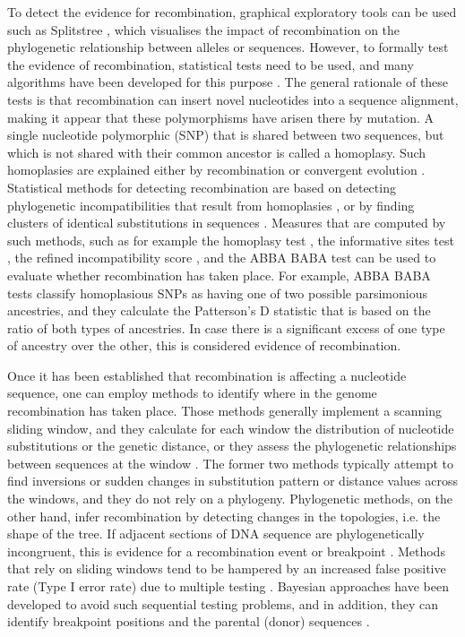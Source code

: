 To detect the evidence for recombination, graphical exploratory tools can be used such as Splitstree \parencite{Huson2006}, which visualises the impact of recombination on the phylogenetic relationship between alleles or sequences. However, to formally test the evidence of recombination, statistical tests need to be used, and many algorithms have been developed for this purpose \parencite{Lemey2009b,Lemey2009c}. The general rationale of these tests is that recombination can insert novel nucleotides into a sequence alignment, making it appear that these polymorphisms have arisen there by mutation. A single nucleotide polymorphic (SNP) that is shared between two sequences, but which is not shared with their common ancestor is called a homoplasy. Such homoplasies are explained either by recombination or convergent evolution \parencite{MaynardSmith1998}. Statistical methods for detecting recombination are based on detecting phylogenetic incompatibilities that result from homoplasies \parencite{Bruen2006,Posada2002}, or by finding clusters of identical substitutions in sequences \parencite{Posada2002}. Measures that are computed by such methods, such as for example the homoplasy test \parencite{MaynardSmith1998}, the informative sites test \parencite{Worobey2001a}, the refined incompatibility score \parencite{Bruen2006}, and the ABBA BABA test \parencite{SMartin2014,Green2010a} can be used to evaluate whether recombination has taken place. For example, ABBA BABA tests classify homoplasious SNPs as having one of two possible parsimonious ancestries, and they calculate the Patterson’s D statistic that is based on the ratio of both types of ancestries. In case there is a significant excess of one type of ancestry over the other, this is considered evidence of recombination.

Once it has been established that recombination is affecting a nucleotide sequence, one can employ methods to identify where in the genome recombination has taken place. Those methods generally implement a scanning sliding window, and they calculate for each window the distribution of nucleotide substitutions or the genetic distance, or they assess the phylogenetic relationships between sequences at the window \parencite{Lemey2009c,Posada2002}. The former two methods typically attempt to find inversions or sudden changes in substitution pattern or distance values across the windows, and they do not rely on a phylogeny. Phylogenetic methods, on the other hand, infer recombination by detecting changes in the topologies, i.e. the shape of the tree. If adjacent sections of DNA sequence are phylogenetically incongruent, this is evidence for a recombination event or breakpoint \parencite{Lemey2009b}. Methods that rely on sliding windows tend to be hampered by an increased false positive rate (Type I error rate) due to multiple testing \parencite{Lemey2009b}. Bayesian approaches \parencite{Paraskevis2005} have been developed to avoid such sequential testing problems, and in addition, they can identify breakpoint positions and the parental (donor) sequences \parencite{Suchard2002}.

